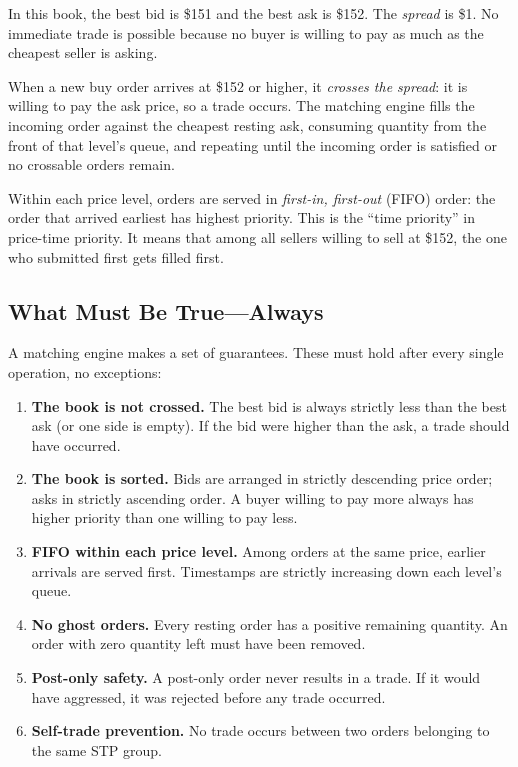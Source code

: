 \documentclass[11pt,a4paper]{article}
\begin{document}
In this book, the best bid is \$151 and the best ask is \$152. The
\emph{spread} is \$1. No immediate trade is possible because no buyer
is willing to pay as much as the cheapest seller is asking.

When a new buy order arrives at \$152 or higher, it \emph{crosses the
spread}: it is willing to pay the ask price, so a trade occurs. The
matching engine fills the incoming order against the cheapest resting
ask, consuming quantity from the front of that level's queue, and
repeating until the incoming order is satisfied or no crossable orders
remain.

Within each price level, orders are served in \emph{first-in,
first-out} (FIFO) order: the order that arrived earliest has
highest priority. This is the ``time priority'' in price-time priority.
It means that among all sellers willing to sell at \$152, the one who
submitted first gets filled first.

\subsection{What Must Be True---Always}
\label{sec:invariants-intro}

A matching engine makes a set of guarantees. These must hold after
every single operation, no exceptions:

\begin{enumerate}[nosep]
\item \textbf{The book is not crossed.} The best bid is always strictly
      less than the best ask (or one side is empty). If the bid were
      higher than the ask, a trade should have occurred.

\item \textbf{The book is sorted.} Bids are arranged in strictly
      descending price order; asks in strictly ascending order. A buyer
      willing to pay more always has higher priority than one willing to
      pay less.

\item \textbf{FIFO within each price level.} Among orders at the same
      price, earlier arrivals are served first. Timestamps are
      strictly increasing down each level's queue.

\item \textbf{No ghost orders.} Every resting order has a positive
      remaining quantity. An order with zero quantity left must have
      been removed.

\item \textbf{Post-only safety.} A post-only order never results in a
      trade. If it would have aggressed, it was rejected before any
      trade occurred.

\item \textbf{Self-trade prevention.} No trade occurs between two
      orders belonging to the same STP group.
\end{enumerate}
\end{document}
